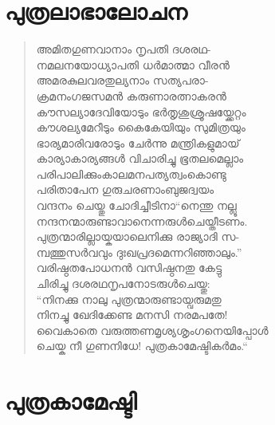 \section{പുത്രലാഭാലോചന}

\begin{verse}
അമിതഗുണവാനാം നൃപതി ദശരഥ-\\
നമലനയോധ്യാപതി ധര്‍മാത്മാ വീരന്‍\\
അമരകുലവരതുല്യനാം സത്യപരാ-\\
ക്രമനംഗജസമന്‍ കരുണാരത്നാകരന്‍\\
കൗസല്യാദേവിയോടും ഭര്‍തൃശുശ്രൂഷയ്ക്കേറ്റം\\
കൗശല്യമേറീടും കൈകേയിയും സുമിത്രയും\\
ഭാര്യമാരിവരോടും ചേര്‍ന്നു മന്ത്രികളുമായ്\\
കാര്യാകാര്യങ്ങള്‍ വിചാരിച്ചു ഭൂതലമെല്ലാം\\
പരിപാലിക്കുംകാലമനപത്യത്വംകൊണ്ടു\\
പരിതാപേന ഗുരുചരണാംബുജദ്വയം\\
വന്ദനം ചെയ്തു ചോദിച്ചീടിനാ“നെന്തു നല്ലൂ\\
നന്ദനന്മാരുണ്ടാവാനെന്നരുള്‍ചെയ്തീടണം.\\
പുത്രന്മാരില്ലായ്കയാലെനിക്കു രാജ്യാദി സ-\\
മ്പത്തുസര്‍വവും ദുഃഖപ്രദമെന്നറിഞ്ഞാലും.”\\
വരിഷ്ഠതപോധനന്‍ വസിഷ്ഠനതു കേട്ടു\\
ചിരിച്ചു ദശരഥനൃപനോടരുള്‍ചെയ്തു:\\
“നിനക്കു നാലു പുത്രന്മാരുണ്ടായ്വരുമതു\\
നിനച്ചു ഖേദിക്കേണ്ട മനസി നരമപതേ!\\
വൈകാതെ വരുത്തണമൃശ്യശൃംഗനെയിപ്പോള്‍\\
ചെയ്ക നീ ഗുണനിധേ! പുത്രകാമേഷ്ടികര്‍മം.“
\end{verse}

\section{പുത്രകാമേഷ്ടി}

